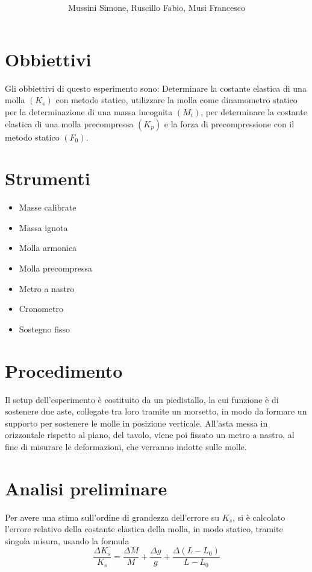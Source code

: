 \documentclass[12pt, a4paper]{article}
\title{\textbf{\scalebox{1.4}{\text{{\Huge Molla}}}}}
\date{}
\author{\begin{small}Mussini Simone, Ruscillo Fabio, Musi Francesco\end{small}}
\begin{document}
\maketitle
\section{Obbiettivi}
Gli obbiettivi di questo esperimento sono: 
Determinare la costante elastica di una molla $(K_s)$ con metodo statico,  utilizzare la molla come dinamometro statico per la determinazione di una massa incognita $(M_i)$, per determinare la costante elastica di una molla precompressa $(K_p)$ e la forza di precompressione con il metodo statico $(F_0)$.


\section{Strumenti}
    \begin{itemize}
        \item Masse calibrate
        \item Massa ignota 
        \item Molla armonica   
        \item Molla precompressa 
        \item Metro a nastro 
        \item Cronometro 
        \item Sostegno fisso 
    \end{itemize}

    
\section{Procedimento}
Il setup dell'esperimento è costituito da un piedistallo, la cui funzione è di sostenere due aste, collegate tra loro tramite un morsetto, in modo da formare un supporto per sostenere le molle in posizione verticale.
All'asta messa in orizzontale rispetto al piano, del tavolo, viene poi fissato un metro a nastro, al fine di misurare le deformazioni, che verranno indotte sulle molle. 

\section{Analisi preliminare}
Per avere una stima sull'ordine di grandezza dell'errore su $K_s$, si è calcolato l'errore relativo della costante elastica della molla, in modo statico, tramite singola misura, usando la formula 
\begin{equation*}
    \frac{\Delta K_s}{K_s}=\frac{\Delta M}{M}+\frac{\Delta g}{g}+ \frac{\Delta (L-L_0)}{L-L_0}
\end{equation*}
\end{document}
